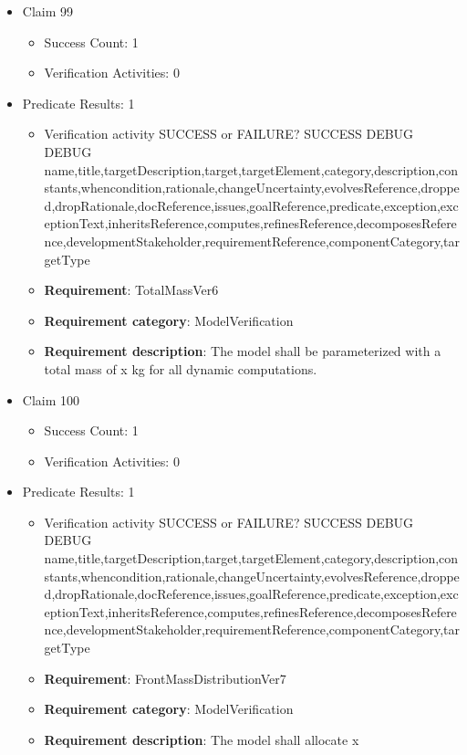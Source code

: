 \documentclass{article}
\begin{document}
\begin{itemize}
  				  \item Claim 99
				\begin{itemize}
			    	\item Success Count: 1 
			    	\item Verification Activities: 0
				\end{itemize}
				
									    
				\item Predicate Results: 1
					\begin{itemize}				
					\item Verification activity SUCCESS or FAILURE? SUCCESS
					DEBUG DEBUG name,title,targetDescription,target,targetElement,category,description,constants,whencondition,rationale,changeUncertainty,evolvesReference,dropped,dropRationale,docReference,issues,goalReference,predicate,exception,exceptionText,inheritsReference,computes,refinesReference,decomposesReference,developmentStakeholder,requirementReference,componentCategory,targetType
					\item \textbf{Requirement}: TotalMassVer6 
					\item \textbf{Requirement category}: ModelVerification
					\item \textbf{Requirement description}: The model shall be parameterized with a total mass of x kg for all dynamic computations.
					\end{itemize}

  				  \item Claim 100
				\begin{itemize}
			    	\item Success Count: 1 
			    	\item Verification Activities: 0
				\end{itemize}
				
									    
				\item Predicate Results: 1
					\begin{itemize}				
					\item Verification activity SUCCESS or FAILURE? SUCCESS
					DEBUG DEBUG name,title,targetDescription,target,targetElement,category,description,constants,whencondition,rationale,changeUncertainty,evolvesReference,dropped,dropRationale,docReference,issues,goalReference,predicate,exception,exceptionText,inheritsReference,computes,refinesReference,decomposesReference,developmentStakeholder,requirementReference,componentCategory,targetType
					\item \textbf{Requirement}: FrontMassDistributionVer7 
					\item \textbf{Requirement category}: ModelVerification
					\item \textbf{Requirement description}: The model shall allocate x%
					\end{itemize}


\end{itemize}
\end{document}
